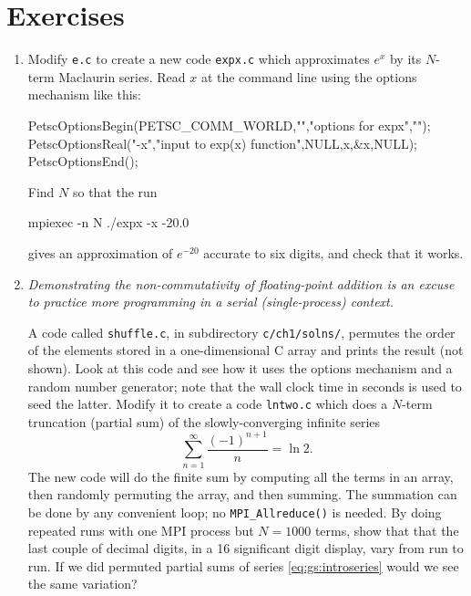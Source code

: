 \bigskip
\section{Exercises}

\renewcommand{\labelenumi}{\arabic{chapter}.\arabic{enumi}\quad}
\begin{enumerate}

\item \label{exer:gs:expx}  Modify \texttt{e.c} to create a new code \texttt{expx.c} which approximates $e^x$ by its $N$-term Maclaurin series.  Read $x$ at the command line using the \PETSc options mechanism like this:
\begin{code}
  PetscOptionsBegin(PETSC_COMM_WORLD,"","options for expx","");
  PetscOptionsReal("-x","input to exp(x) function",NULL,x,&x,NULL);
  PetscOptionsEnd();
\end{code}
Find $N$ so that the run
\begin{cline}
mpiexec -n N ./expx -x -20.0
\end{cline}
gives an approximation of $e^{-20}$ accurate to six digits, and check that it works.

\item \label{exer:gs:nondeterminant}  \emph{Demonstrating the non-commutativity of floating-point addition is an excuse to practice more \PETSc programming in a serial (single-process) context.}

A code called \texttt{shuffle.c}, in subdirectory \texttt{c/ch1/solns/}, permutes the order of the elements stored in a one-dimensional C array and prints the result (not shown).  Look at this code and see how it uses the \PETSc options mechanism and a \PETSc random number generator; note that the wall clock time in seconds is used to seed the latter.  Modify it to create a code \texttt{lntwo.c} which does a $N$-term truncation (partial sum) of the slowly-converging infinite series
\begin{equation}
\sum_{n=1}^\infty \frac{(-1)^{n+1}}{n} = \ln 2.
\label{eq:gs:lntwo}
\end{equation}
The new code will do the finite sum by computing all the terms in an array, then randomly permuting the array, and then summing.  The summation can be done by any convenient loop; no \texttt{MPI\_Allreduce()} is needed.  By doing repeated runs with one MPI process but $N=1000$ terms, show that that the last couple of decimal digits, in a 16 significant digit display, vary from run to run.  If we did permuted partial sums of series \eqref{eq:gs:introseries} would we see the same variation?


\end{enumerate}
